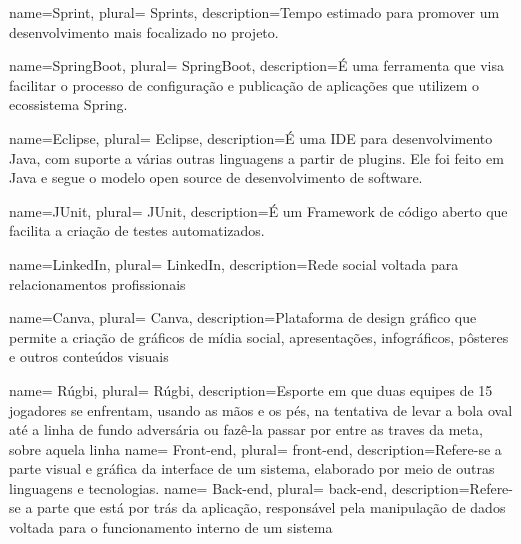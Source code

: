 


 {
    name=Sprint,
    plural= {Sprints},
    description={Tempo estimado para promover um desenvolvimento mais focalizado no projeto.}
}

 {
    name=SpringBoot,
    plural= {SpringBoot},
    description={É uma ferramenta que visa facilitar o processo de configuração e publicação de aplicações que utilizem o ecossistema Spring.}
}

 {
    name=Eclipse,
    plural= {Eclipse},
    description={É uma IDE para desenvolvimento Java, com suporte a várias outras linguagens a partir de plugins. Ele foi feito em Java e segue o modelo open source de desenvolvimento de software.}
}

 {
    name=JUnit,
    plural= {JUnit},
    description={É um Framework de código aberto que facilita a criação de testes automatizados.}
}


 {
    name=LinkedIn,
    plural= {LinkedIn},
    description={Rede social voltada para relacionamentos profissionais}
}

 {
    name=Canva,
    plural= {Canva},
    description={Plataforma de design gráfico que permite a criação de gráficos de mídia social, apresentações, infográficos, pôsteres e outros conteúdos visuais}
}

 {
    name= R{\'u}gbi,
    plural= {R{\'u}gbi},
    description={Esporte em que duas equipes de 15 jogadores se enfrentam, usando as mãos e os pés, na tentativa de levar a bola oval at{\'e} a linha de fundo adversária ou faz{\^e}-la passar por entre as traves da meta, sobre aquela linha }
}
 {
    name= Front-end,
    plural= {front-end},
    description={Refere-se a parte visual e gráfica da interface de um sistema, elaborado por meio de outras linguagens e tecnologias.}
}
 {
    name= Back-end,
    plural= {back-end},
    description={Refere-se a parte que está por trás da aplicação, responsável pela manipulação de dados voltada para o funcionamento interno de um sistema}
}

